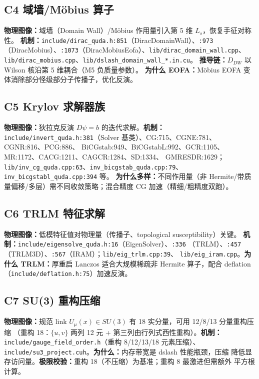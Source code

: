 \documentclass[UTF8]{ctexart}
\begin{document}
\subsection{C4 域墙/Möbius 算子}
\textbf{物理图像：}域墙（Domain Wall）/Möbius 作用量引入第 5 维 $L_s$，恢复手征对称性。
\textbf{机制：}\nolinkurl{include/dirac_quda.h:851}（DiracDomainWall）、\texttt{:973}
（DiracMobius）、\texttt{:1073}（DiracMobiusEofa）、\nolinkurl{lib/dirac_domain_wall.cpp}、
\texttt{lib/dirac\_mobius.cpp}、\nolinkurl{lib/dslash_domain_wall_*.in.cu}。
\textbf{推导链：}$D_{DW}$ 以 Wilson 核沿第 5 维耦合（M5 负质量参数）。
\textbf{为什么 EOFA：}Möbius EOFA 变体消除部分怪级部分子传播子，优化反演。

\subsection{C5 Krylov 求解器族}
\textbf{物理图像：}狄拉克反演 $D\psi=b$ 的迭代求解。\textbf{机制：}
\nolinkurl{include/invert_quda.h:381}（Solver 基类）、CG:715、CGNE:781、CGNR:816、PCG:886、
BiCGstab:949、BiCGstabL:992、GCR:1105、MR:1172、CACG:1211、CAGCR:1284、SD:1334、
GMRESDR:1629；\texttt{lib/inv\_cg\_quda.cpp:63}、\nolinkurl{inv_bicgstab_quda.cpp:79}、
\nolinkurl{inv_bicgstabl_quda.cpp:394} 等。
\textbf{为什么多样：}不同作用量（非 Hermite/带质量偏移/多层）需不同收敛策略；混合精度
CG 加速（精细/粗精度双跑）。

\subsection{C6 TRLM 特征求解}
\textbf{物理图像：}低模特征值对物理量（传播子、topological susceptibility）关键。
\textbf{机制：}\nolinkurl{include/eigensolve_quda.h:16}（EigenSolver）、\texttt{:336}
（TRLM）、\texttt{:457}（TRLM3D）、\texttt{:567}（IRAM）；\texttt{lib/eig\_trlm.cpp:39}、
\texttt{lib/eig\_iram.cpp}。\textbf{为什么 TRLM：}厚重启 Lanczos 适合大规模稀疏非 Hermite
算子，配合 deflation（\texttt{include/deflation.h:75}）加速反演。

\subsection{C7 SU(3) 重构压缩}
\textbf{物理图像：}规范 link $U_\mu(x)\in SU(3)$ 有 18 实分量，可用 12/8/13 分量重构压缩
（重构 18：$\{u,v\}$ 两列 12 元 + 第三列由行列式西性重构）。\textbf{机制：}
\nolinkurl{include/gauge_field_order.h}（重构 8/12/13/18 元素压缩）、
\nolinkurl{include/su3_project.cuh}。\textbf{为什么：}内存带宽是 dslash 性能瓶颈，压缩
降低显存访问量。\textbf{极限校验：}重构 18（不压缩）为基准；重构 8 最激进但需额外
平方根计算。
\end{document}
